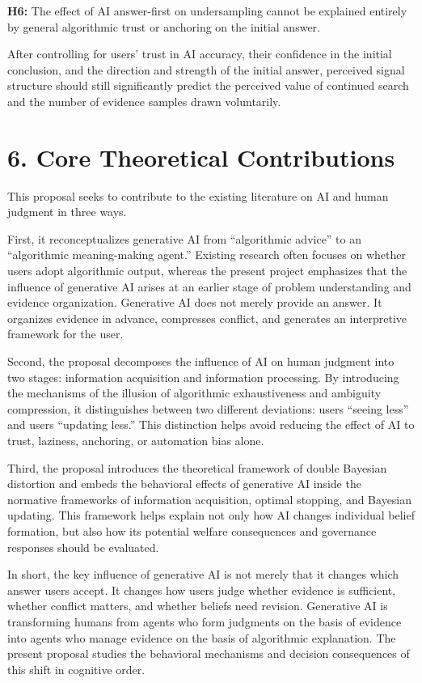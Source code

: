 \textbf{H6:} The effect of AI answer-first on undersampling cannot be explained entirely by general algorithmic trust or anchoring on the initial answer.

After controlling for users' trust in AI accuracy, their confidence in the initial conclusion, and the direction and strength of the initial answer, perceived signal structure should still significantly predict the perceived value of continued search and the number of evidence samples drawn voluntarily.

\section*{6. Core Theoretical Contributions}

This proposal seeks to contribute to the existing literature on AI and human judgment in three ways.

First, it reconceptualizes generative AI from ``algorithmic advice'' to an ``algorithmic meaning-making agent.'' Existing research often focuses on whether users adopt algorithmic output, whereas the present project emphasizes that the influence of generative AI arises at an earlier stage of problem understanding and evidence organization. Generative AI does not merely provide an answer. It organizes evidence in advance, compresses conflict, and generates an interpretive framework for the user.

Second, the proposal decomposes the influence of AI on human judgment into two stages: information acquisition and information processing. By introducing the mechanisms of the illusion of algorithmic exhaustiveness and ambiguity compression, it distinguishes between two different deviations: users ``seeing less'' and users ``updating less.'' This distinction helps avoid reducing the effect of AI to trust, laziness, anchoring, or automation bias alone.

Third, the proposal introduces the theoretical framework of double Bayesian distortion and embeds the behavioral effects of generative AI inside the normative frameworks of information acquisition, optimal stopping, and Bayesian updating. This framework helps explain not only how AI changes individual belief formation, but also how its potential welfare consequences and governance responses should be evaluated.

In short, the key influence of generative AI is not merely that it changes which answer users accept. It changes how users judge whether evidence is sufficient, whether conflict matters, and whether beliefs need revision. Generative AI is transforming humans from agents who form judgments on the basis of evidence into agents who manage evidence on the basis of algorithmic explanation. The present proposal studies the behavioral mechanisms and decision consequences of this shift in cognitive order.
